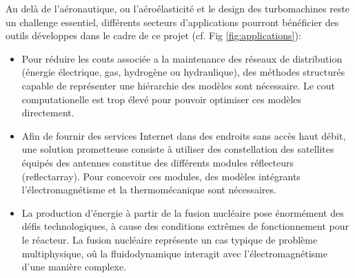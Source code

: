 \documentclass[french]{article}
\begin{document}
Au delà de l'aéronautique, ou l'aéroélasticité et le design des turbomachines reste un challenge essentiel, différents secteurs d'applications pourront bénéficier des outils développes dans le cadre de ce projet (cf. Fig \ref{fig:applications}): \\
\begin{itemize}
	\item Pour réduire les couts associée a la maintenance des réseaux de distribution (énergie électrique, gas, hydrogène ou hydraulique), des méthodes structurés capable de représenter une hiérarchie des modèles sont nécessaire. Le cout computationelle est trop élevé pour pouvoir optimiser ces modèles directement.
	\item Afin de fournir des services Internet dans des endroits sans accès haut débit, une solution prometteuse consiste à utiliser des constellation des satellites équipés des antennes constitue des différents modules réflecteurs (reflectarray). Pour concevoir ces modules, des modèles intégrants l'électromagnétisme et la thermomécanique sont nécessaires.
	\item La production d'énergie \`a partir de la fusion nucléaire pose énormément des défis technologiques, \`a cause des conditions extrêmes de fonctionnement pour le réacteur. La fusion nucléaire représente un cas typique de problème multiphysique, o\^u la fluidodynamique interagit avec l'électromagnétisme d'une manière complexe.
\end{itemize}
\end{document}
